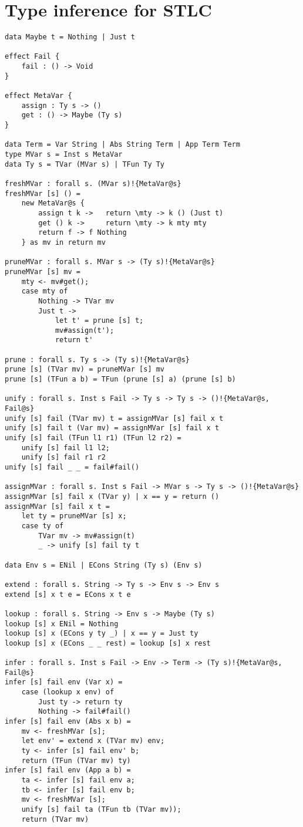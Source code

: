 \section{Type inference for STLC}
\begin{verbatim}
data Maybe t = Nothing | Just t

effect Fail {
	fail : () -> Void
}

effect MetaVar {
	assign : Ty s -> ()
	get : () -> Maybe (Ty s)
}

data Term = Var String | Abs String Term | App Term Term
type MVar s = Inst s MetaVar
data Ty s = TVar (MVar s) | TFun Ty Ty

freshMVar : forall s. (MVar s)!{MetaVar@s}
freshMVar [s] () =
	new MetaVar@s {
		assign t k -> 	return \mty -> k () (Just t)
		get () k -> 	return \mty -> k mty mty
		return f -> f Nothing
	} as mv in return mv

pruneMVar : forall s. MVar s -> (Ty s)!{MetaVar@s}
pruneMVar [s] mv =
	mty <- mv#get();
	case mty of
		Nothing -> TVar mv
		Just t ->
			let t' = prune [s] t;
			mv#assign(t');
			return t'

prune : forall s. Ty s -> (Ty s)!{MetaVar@s}
prune [s] (TVar mv) = pruneMVar [s] mv
prune [s] (TFun a b) = TFun (prune [s] a) (prune [s] b)

unify : forall s. Inst s Fail -> Ty s -> Ty s -> ()!{MetaVar@s, Fail@s}
unify [s] fail (TVar mv) t = assignMVar [s] fail x t
unify [s] fail t (Var mv) = assignMVar [s] fail x t
unify [s] fail (TFun l1 r1) (TFun l2 r2) =
	unify [s] fail l1 l2;
	unify [s] fail r1 r2
unify [s] fail _ _ = fail#fail()

assignMVar : forall s. Inst s Fail -> MVar s -> Ty s -> ()!{MetaVar@s}
assignMVar [s] fail x (TVar y) | x == y = return ()
assignMVar [s] fail x t =
	let ty = pruneMVar [s] x;
	case ty of
		TVar mv -> mv#assign(t)
		_ -> unify [s] fail ty t

data Env s = ENil | ECons String (Ty s) (Env s)

extend : forall s. String -> Ty s -> Env s -> Env s
extend [s] x t e = ECons x t e

lookup : forall s. String -> Env s -> Maybe (Ty s)
lookup [s] x ENil = Nothing
lookup [s] x (ECons y ty _) | x == y = Just ty
lookup [s] x (ECons _ _ rest) = lookup [s] x rest

infer : forall s. Inst s Fail -> Env -> Term -> (Ty s)!{MetaVar@s, Fail@s}
infer [s] fail env (Var x) =
	case (lookup x env) of
		Just ty -> return ty
		Nothing -> fail#fail()
infer [s] fail env (Abs x b) =
	mv <- freshMVar [s];
	let env' = extend x (TVar mv) env;
	ty <- infer [s] fail env' b;
	return (TFun (TVar mv) ty)
infer [s] fail env (App a b) =
	ta <- infer [s] fail env a;
	tb <- infer [s] fail env b;
	mv <- freshMVar [s];
	unify [s] fail ta (TFun tb (TVar mv));
	return (TVar mv)


\end{verbatim}
